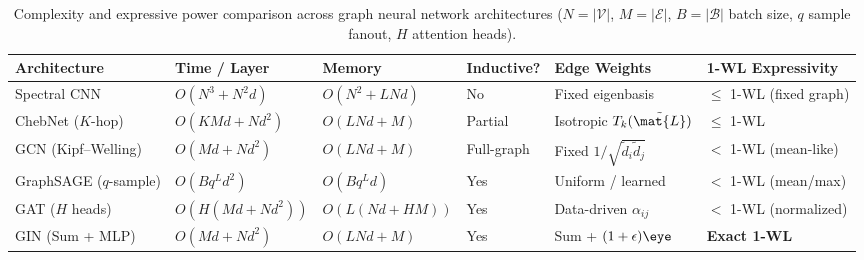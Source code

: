 \documentclass[../../../../master.tex]{subfiles}
\begin{document}
\begin{table}[htbp]
\centering
\caption{Complexity and expressive power comparison across graph neural network architectures ($N=|\mathcal{V}|$, $M=|\mathcal{E}|$, $B=|\mathcal{B}|$ batch size, $q$ sample fanout, $H$ attention heads).}
\label{tab:gnn:complexity}
\small
\begin{tabularx}{\textwidth}{@{}l >{\raggedright\arraybackslash}p{2.6cm} >{\raggedright\arraybackslash}p{2.3cm} >{\raggedright\arraybackslash}p{1.95cm} >{\raggedright\arraybackslash}p{2.0cm} >{\raggedright\arraybackslash}X@{}}
\toprule
\textbf{Architecture} & \textbf{Time / Layer} & \textbf{Memory} & \textbf{Inductive?} & \textbf{Edge Weights} & \textbf{1-WL Expressivity} \\
\midrule
Spectral CNN & $O(N^3 + N^2 d)$ & $O(N^2 + LNd)$ & No & Fixed eigenbasis & $\le$ 1-WL (fixed graph) \\
ChebNet ($K$-hop) & $O(K M d + N d^2)$ & $O(L N d + M)$ & Partial & Isotropic $T_k(\tilde{\mat{L}})$ & $\le$ 1-WL \\
GCN (Kipf--Welling) & $O(M d + N d^2)$ & $O(L N d + M)$ & Full-graph & Fixed $1/\sqrt{\tilde{d}_i\tilde{d}_j}$ & $<$ 1-WL (mean-like) \\
GraphSAGE ($q$-sample) & $O(B q^L d^2)$ & $O(B q^L d)$ & Yes & Uniform / learned & $<$ 1-WL (mean/max) \\
GAT ($H$ heads) & $O(H(M d + N d^2))$ & $O(L(Nd + HM))$ & Yes & Data-driven $\alpha_{ij}$ & $<$ 1-WL (normalized) \\
GIN (Sum + MLP) & $O(M d + N d^2)$ & $O(L N d + M)$ & Yes & Sum + $(1+\epsilon)\eye$ & \textbf{Exact 1-WL} \\
\bottomrule
\end{tabularx}
\end{table}
\end{document}
